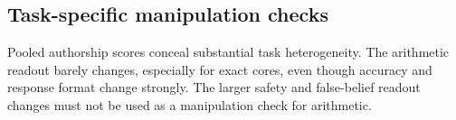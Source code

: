 \subsection{Task-specific manipulation checks}

\begin{center}\end{center}

Pooled authorship scores conceal substantial task heterogeneity. The arithmetic readout barely changes, especially for exact cores, even though accuracy and response format change strongly. The larger safety and false-belief readout changes must not be used as a manipulation check for arithmetic.

